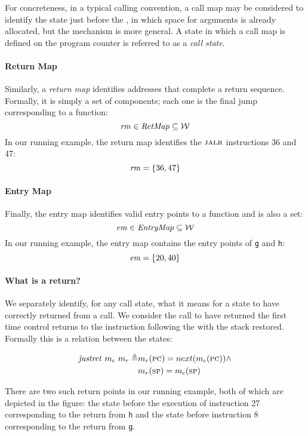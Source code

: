 \documentclass[acmsmall,review,anonymous]{acmart}\settopmatter{printfolios=true,printccs=false,printacmref=false}
\begin{document}
For concreteness, in a typical calling convention, a call map may be
considered to identify the state just before the \jal, in which
space for arguments is already allocated, but the mechanism is more
general. A state in which a call map is defined on the program counter
is referred to as a {\it call state}.

\paragraph*{Return Map}
Similarly, a {\em return map} identifies addresses that complete a
return sequence. Formally, it is simply a set of components; each one
is the final jump corresponding to a function:
%
\[\mathit{rm} \in \mathit{RetMap} \subseteq {\mathcal W}\]
%
In our running example, the return map identifies the $\textsc{jalr}$
instructions 36 and 47:
\[ \mathit{rm} = \{36, 47\} \]

\paragraph*{Entry Map}
Finally, the entry map identifies valid entry points to a
function and is also a set:
\[\mathit{em} \in \mathit{EntryMap} \subseteq {\mathcal W}\]
%
In our running example, the entry map contains the entry
points of {\tt g} and {\tt h}:
\[ \mathit{em} = \{20, 40\} \]

\paragraph*{What is a return?}

We separately identify, for any call state, what it means for a state
to have correctly returned from a call. We consider the call to have
returned the first time control returns to the instruction following
the \jal with the stack restored. Formally this is a relation
between the states:

\[\begin{split}
    \mathit{justret}\ m_c\ m_r \triangleq & m_r(\textsc{pc}) =
    next(m_c(\textsc{pc})) \land \\ & m_r(\textsc{sp}) = m_c(\textsc{sp})
\end{split}\]

There are two such return points in our running example, both of which
are depicted in the figure: the state before the execution of
instruction 27 corresponding to the return from {\tt h} and the state
before instruction 8 corresponding to the return from {\tt g}.

\medskip
\end{document}
